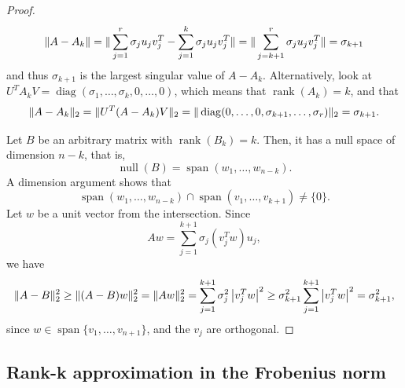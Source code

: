 \documentclass{article}
\begin{document}
\begin{proof}
\begin{equation*}
\| A-A_{k} \| = \| \sum_{j=1}^{r} \sigma_{j} u_{j} v_{j}^{T} - \sum_{j=1}^{k}
\sigma_{j} u_{j} v_{j}^{T} \| = \| \sum_{j=k+1}^{r} \sigma_{j} u_{j}
v_{j}^{T} \| = \sigma_{k+1} 
\end{equation*}
and thus $\sigma_{k+1}$ is the largest singular value of $A-A_{k}$.
Alternatively, look at $U^{T} A_{k} V =
\operatorname{diag}(\sigma_{1},\ldots,\sigma_{k},0,\ldots,0)$, which
means that $\operatorname{rank}(A_{k}) = k$, and that
\begin{equation*}
\| A-A_{k} \|_{2} = \| U^{T} (A-A_{k}) V \|_{2} =
\| \operatorname{diag}(0,\ldots,0,\sigma_{k+1},\ldots,\sigma_{r}) \|_{2}
= \sigma_{k+1}.
\end{equation*}

Let $B$ be an arbitrary matrix with $\operatorname{rank}(B_{k}) =
k$. Then, it has a null space of dimension $n-k$, that is,
\begin{equation*}
\operatorname{null}(B) = \operatorname{span}(w_{1},\ldots,w_{n-k}).
\end{equation*}
A dimension argument shows that
\begin{equation*}
\operatorname{span}(w_{1},\ldots,w_{n-k}) \cap
\operatorname{span}(v_{1},\ldots,v_{k+1}) \ne \{ 0 \}.
\end{equation*}
Let $w$ be a unit vector from the intersection. Since
\begin{equation*}
Aw = \sum_{j=1}^{k+1} \sigma_{j} (v_{j}^{T}w) u_{j},
\end{equation*}
we have
\begin{equation*}
\| A-B \|_{2}^{2} \ge \| (A-B)w \|_{2}^{2} = \| Aw \|_{2}^{2} =
\sum_{j=1}^{k+1} \sigma_{j}^{2} \left| v_{j}^{T}w \right|^{2} \ge
\sigma_{k+1}^{2} \sum_{j=1}^{k+1} \left| v_{j}^{T}w \right|^{2} =
\sigma_{k+1}^{2},
\end{equation*}
since $w \in \operatorname{span}\{v_{1},\ldots,v_{n+1}\}$, and the
$v_{j}$ are orthogonal.
\end{proof}

\subsection*{Rank-k approximation in the Frobenius norm}
\end{document}

